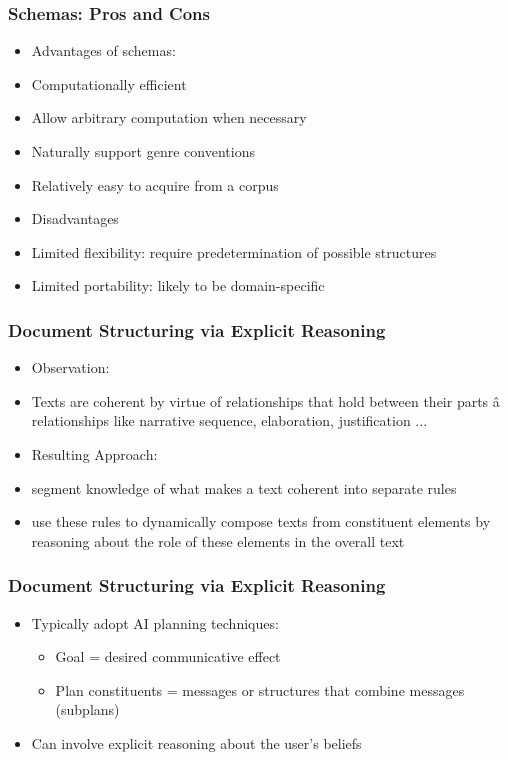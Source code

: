 \documentclass[compress,color=usenames]{beamer}
\begin{document}
\begin{frame}
\frametitle{Schemas: Pros and Cons}

\label{f148}
\begin{itemize}
\item { {Advantages of schemas:}}
\item { {Computationally efficient}}
\item { {Allow arbitrary computation when necessary}}
\item { {Naturally support genre conventions}}
\item { {Relatively easy to acquire from a corpus}}
\item { {Disadvantages}}
\item { {Limited flexibility: require predetermination of possible structures}}
\item { {Limited portability: likely to be domain-specific}}
\end{itemize}
 
\end{frame}

\begin{frame}
\frametitle{Document Structuring via Explicit Reasoning}

\label{f150}
\begin{itemize}
\item { {Observation:}}
\item { {Texts are coherent by virtue of relationships that hold between their parts \^a relationships like narrative sequence, elaboration, justification ...}}
\item { {Resulting Approach:}}
\item { {segment knowledge of what makes a text coherent into separate rules }}
\item { {use these rules to dynamically compose texts from constituent elements by reasoning about the role of these elements in the overall text}}
\end{itemize}
 \end{frame}

\begin{frame}
\frametitle{Document Structuring via Explicit Reasoning}

\label{f152}
\begin{itemize}
\item { {Typically adopt AI planning techniques:}}
\begin{itemize}
\item Goal = desired communicative effect
\item Plan constituents = messages or structures that combine messages (subplans)
\end{itemize}
\item { {Can involve explicit reasoning about the user's beliefs}}
\end{itemize}
 
\end{frame}
\end{document}
